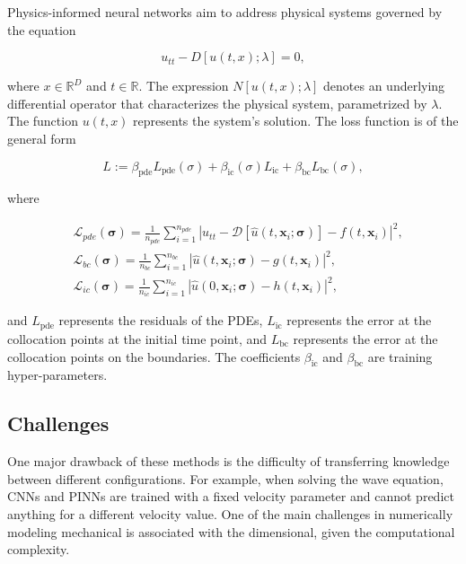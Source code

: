 \documentclass[11pt,twoside]{article}
\begin{document}
Physics-informed neural networks aim to address physical systems governed by the equation

$$
u_{tt} - D[u(t, x); \lambda] = 0,
$$

where \(x \in \mathbb{R}^D\) and \(t \in \mathbb{R}\). The expression \(N[u(t, x); \lambda]\) denotes an underlying differential operator 
that characterizes the physical system, parametrized by \(\lambda\). The function \(u(t, x)\) represents the system's solution. The loss 
function is of the general form 

$$ L := \beta_{\text{pde}}L_{\text{pde}}(\sigma) + \beta_{\text{ic}}(\sigma) L_{\text{ic}} + \beta_{\text{bc}} L_{\text{bc}}(\sigma) ,$$

where

$$
\begin{aligned}
& \mathcal{L}_{pde}(\boldsymbol{\sigma})=\frac{1}{n_{pde}} \sum_{i=1}^{n_{pde}}\left|u_{tt} - \mathcal{D}\left[\hat{u}\left(t, \boldsymbol{x}_i ; \boldsymbol{\sigma}\right)\right]-f\left(t, \boldsymbol{x}_i\right)\right|^2, \\
& \mathcal{L}_{bc}(\boldsymbol{\sigma})=\frac{1}{n_{bc}} \sum_{i=1}^{n_{bc}}\left|\hat{u}\left(t, \boldsymbol{x}_i ; \boldsymbol{\sigma}\right)-g\left(t, \boldsymbol{x}_i\right)\right|^2, \\
& \mathcal{L}_{ic}(\boldsymbol{\sigma})=\frac{1}{n_{ic}} \sum_{i=1}^{n_{ic}}\left|\hat{u}\left(0, \boldsymbol{x}_i ; \boldsymbol{\sigma}\right)-h\left(t,\boldsymbol{x}_i\right)\right|^2,
\end{aligned}
$$

and \( L_{\text{pde}} \) represents the residuals of the PDEs, \( L_{\text{ic}} \) represents the error at the collocation points at the 
initial time point, and \( L_{\text{bc}} \) represents the error at the collocation points on the boundaries. The coefficients 
\(\beta_{\text{ic}}\) and \(\beta_{\text{bc}}\) are training hyper-parameters.

\subsection{Challenges}

One major drawback of these methods is the difficulty of transferring knowledge between different configurations. For example, when solving 
the wave equation, CNNs and PINNs are trained with a fixed velocity parameter and cannot predict anything for a different velocity value. 
One of the main challenges in numerically modeling mechanical is associated with the dimensional, given the computational complexity.
\end{document}

